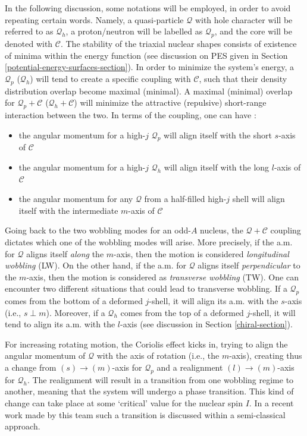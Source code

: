 In the following discussion, some notations will be employed, in order to avoid repeating certain words. Namely, a quasi-particle $\mathcal{Q}$ with hole character will be referred to as $\mathcal{Q}_h$, a proton/neutron will be labelled as $\mathcal{Q}_p$, and the core will be denoted with $\mathscr{C}$. The stability of the triaxial nuclear shapes consists of existence of minima within the energy function (see discussion on PES given in Section \ref{potential-energy-surfaces-section}). In order to minimize the system's energy, a $\mathcal{Q}_p$ ($\mathcal{Q}_h$) will tend to create a specific coupling with $\mathscr{C}$, such that their density distribution overlap become maximal (minimal). A maximal (minimal) overlap for $\mathcal{Q}_p+\mathscr{C}$ ($\mathcal{Q}_h+\mathscr{C}$) will minimize the attractive (repulsive) short-range interaction between the two. In terms of the coupling, one can have \cite{frauendorf2014transverse}:
\begin{itemize}
    \item the angular momentum for a high-$j$ $\mathcal{Q}_p$ will align itself with the short $s$-axis of $\mathscr{C}$ 
    \item the angular momentum for a high-$j$ $\mathcal{Q}_h$ will align itself with the long $l$-axis of $\mathscr{C}$
    \item the angular momentum for any $\mathcal{Q}$ from a half-filled high-$j$ shell will align itself with the intermediate $m$-axis of $\mathscr{C}$
\end{itemize}

Going back to the two wobbling modes for an odd-$A$ nucleus, the $\mathcal{Q}+\mathscr{C}$ coupling dictates which one of the wobbling modes will arise. More precisely, if the a.m. for $\mathcal{Q}$ aligns itself \emph{along} the $m$-axis, then the motion is considered \emph{longitudinal wobbling} (LW). On the other hand, if the a.m. for $\mathcal{Q}$ aligns itself \emph{perpendicular} to the $m$-axis, then the motion is considered as \emph{transverse wobbling} (TW). One can encounter two different situations that could lead to transverse wobbling. If a $\mathcal{Q}_p$ comes from the bottom of a deformed $j$-shell, it will align its a.m. with the $s$-axis (i.e., $s\perp m$). Moreover, if a $\mathcal{Q}_h$ comes from the top of a deformed $j$-shell, it will tend to align its a.m. with the $l$-axis (see discussion in Section \ref{chiral-section}).

For increasing rotating motion, the Coriolis effect kicks in, trying to align the angular momentum of $\mathcal{Q}$ with the axis of rotation (i.e., the $m$-axis), creating thus a change from $(s)\to (m)$-axis for $\mathcal{Q}_p$ and a realignment $(l) \to (m)$-axis for $\mathcal{Q}_h$. The realignment will result in a transition from one wobbling regime to another, meaning that the system will undergo a phase transition. This kind of change can take place at some `critical' value for the nuclear spin $I$. In a recent work made by this team \cite{poenaru2021extensive1,poenaru2021extensive2} such a transition is discussed within a semi-classical approach.

